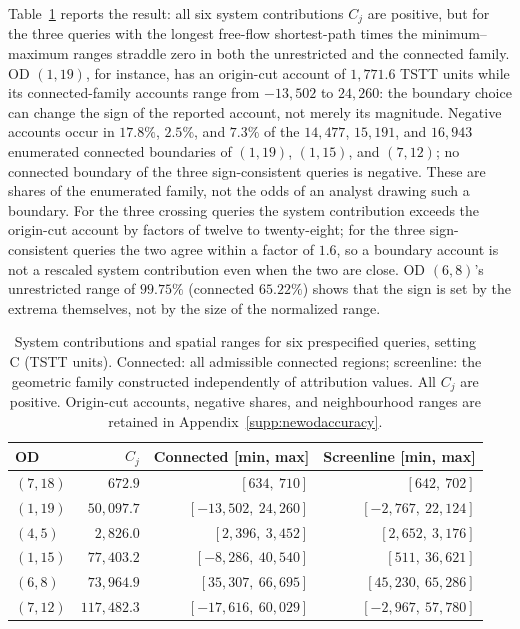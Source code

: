 Table~\ref{tab:newod} reports the result: all six system contributions
$C_j$ are positive, but for the three queries with the longest
free-flow shortest-path times the minimum--maximum ranges straddle
zero in both the unrestricted and the connected family. OD $(1,19)$,
for instance, has an origin-cut account of $1{,}771.6$ TSTT units
while its connected-family accounts range from $-13{,}502$ to
$24{,}260$: the boundary choice can change the sign of the reported
account, not merely its magnitude. Negative accounts occur in
$17.8\%$, $2.5\%$, and $7.3\%$ of the $14{,}477$, $15{,}191$, and
$16{,}943$ enumerated connected boundaries of $(1,19)$, $(1,15)$, and
$(7,12)$; no connected boundary of the three sign-consistent queries
is negative. These are shares of the enumerated family, not the odds
of an analyst drawing such a boundary. For the three crossing queries
the system contribution exceeds the origin-cut account by factors of
twelve to twenty-eight; for the three sign-consistent queries the two
agree within a factor of $1.6$, so a boundary account is not a
rescaled system contribution even when the two are close. OD
$(6,8)$'s unrestricted range of $99.75\%$ (connected $65.22\%$) shows
that the sign is set by the extrema themselves, not by the size of
the normalized range.

\begin{table}[pos=htbp]
\caption{System contributions and spatial ranges for six prespecified queries,
setting C (TSTT units). Connected: all admissible connected regions;
screenline: the geometric family constructed independently of attribution
values. All $C_j$ are positive. Origin-cut accounts, negative shares, and
neighbourhood ranges are retained in Appendix~\ref{supp:newodaccuracy}.}
\label{tab:newod}
\small
\begin{tabular*}{\tblwidth}{@{\extracolsep{\fill}}lrrr}
\toprule
OD & $C_j$ & Connected [min, max] & Screenline [min, max]\\
\midrule
$(7,18)$ & $672.9$ & $[634{,}\ 710]$ & $[642{,}\ 702]$ \\
$(1,19)$ & $50{,}097.7$ & $[-13{,}502{,}\ 24{,}260]$ & $[-2{,}767{,}\ 22{,}124]$ \\
$(4,5)$ & $2{,}826.0$ & $[2{,}396{,}\ 3{,}452]$ & $[2{,}652{,}\ 3{,}176]$ \\
$(1,15)$ & $77{,}403.2$ & $[-8{,}286{,}\ 40{,}540]$ & $[511{,}\ 36{,}621]$ \\
$(6,8)$ & $73{,}964.9$ & $[35{,}307{,}\ 66{,}695]$ & $[45{,}230{,}\ 65{,}286]$ \\
$(7,12)$ & $117{,}482.3$ & $[-17{,}616{,}\ 60{,}029]$ & $[-2{,}967{,}\ 57{,}780]$ \\
\bottomrule
\end{tabular*}
\end{table}

